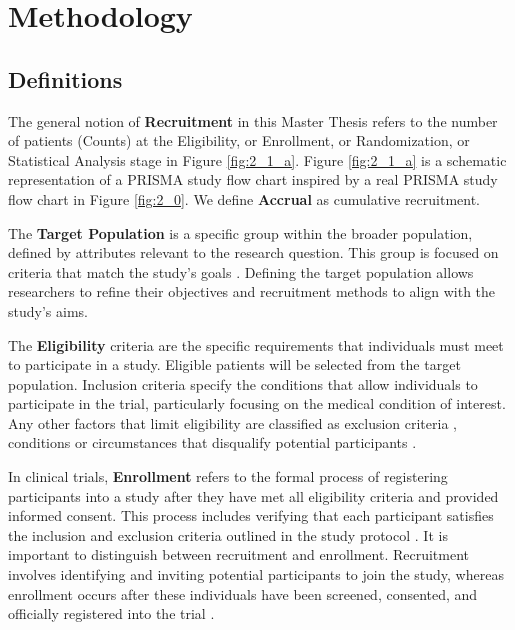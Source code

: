 








\chapter{Methodology} 

\section{Definitions}

The general notion of \textbf{Recruitment} in this Master Thesis refers to the number of patients (Counts) at the Eligibility, or Enrollment, or Randomization, or Statistical Analysis stage in Figure \ref{fig:2_1_a}. Figure \ref{fig:2_1_a} is a schematic representation of a PRISMA study flow chart inspired by a real PRISMA study flow chart in Figure \ref{fig:2_0}. We define \textbf{Accrual} as cumulative recruitment.

The \textbf{Target Population} is a specific group within the broader population, defined by attributes relevant to the research question. This group is focused on criteria that match the study's goals \citep{willie2024population}. Defining the target population allows researchers to refine their objectives and recruitment methods to align with the study's aims.


The \textbf{Eligibility} criteria are the specific requirements that individuals must meet to participate in a study. Eligible patients will be selected from the target population. Inclusion criteria specify the conditions that allow individuals to participate in the trial, particularly focusing on the medical condition of interest. Any other factors that limit eligibility are classified as exclusion criteria \citep{van2007eligibility}, conditions or circumstances that disqualify potential participants \citep{food2018evaluating}.


In clinical trials, \textbf{Enrollment} refers to the formal process of registering participants into a study after they have met all eligibility criteria and provided informed consent. This process includes verifying that each participant satisfies the inclusion and exclusion criteria outlined in the study protocol \citep{NIH2021}. It is important to distinguish between recruitment and enrollment. Recruitment involves identifying and inviting potential participants to join the study, whereas enrollment occurs after these individuals have been screened, consented, and officially registered into the trial \citep{frank2004current}. 

